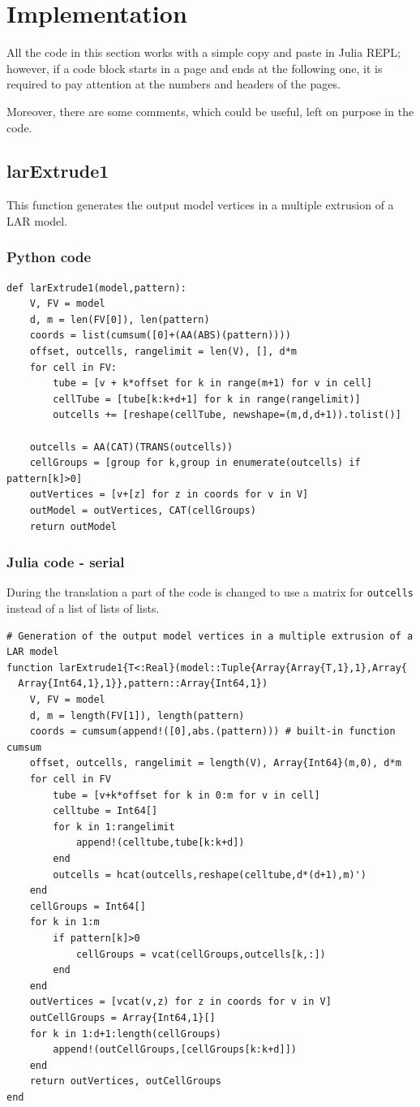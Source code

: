 \documentclass[a4paper,12pt,titlepage]{article}					%
\begin{document}
\section{Implementation}
All the code in this section works with a simple copy and paste in Julia REPL; however, if a code block starts in a page and ends at the following one, it is required to pay attention at the numbers and headers of the pages.

Moreover, there are some comments, which could be useful, left on purpose in the code.

\subsection{larExtrude1}
This function generates the output model vertices in a multiple extrusion of a LAR model.

\subsubsection{Python code}
\begin{verbatim}
def larExtrude1(model,pattern):
    V, FV = model
    d, m = len(FV[0]), len(pattern)
    coords = list(cumsum([0]+(AA(ABS)(pattern))))
    offset, outcells, rangelimit = len(V), [], d*m
    for cell in FV:
        tube = [v + k*offset for k in range(m+1) for v in cell]
        cellTube = [tube[k:k+d+1] for k in range(rangelimit)]
        outcells += [reshape(cellTube, newshape=(m,d,d+1)).tolist()]
        
    outcells = AA(CAT)(TRANS(outcells))
    cellGroups = [group for k,group in enumerate(outcells) if pattern[k]>0]
    outVertices = [v+[z] for z in coords for v in V]
    outModel = outVertices, CAT(cellGroups)
    return outModel
\end{verbatim}

\subsubsection{Julia code - serial}
During the translation a part of the code is changed to use a matrix for \texttt{outcells} instead of a list of lists of lists.

\begin{Verbatim}
# Generation of the output model vertices in a multiple extrusion of a LAR model
function larExtrude1{T<:Real}(model::Tuple{Array{Array{T,1},1},Array{
  Array{Int64,1},1}},pattern::Array{Int64,1})
	V, FV = model
	d, m = length(FV[1]), length(pattern)
	coords = cumsum(append!([0],abs.(pattern))) # built-in function cumsum
	offset, outcells, rangelimit = length(V), Array{Int64}(m,0), d*m
	for cell in FV
		tube = [v+k*offset for k in 0:m for v in cell]
		celltube = Int64[]
		for k in 1:rangelimit
			append!(celltube,tube[k:k+d])
		end
		outcells = hcat(outcells,reshape(celltube,d*(d+1),m)')
	end
	cellGroups = Int64[]
	for k in 1:m
		if pattern[k]>0
			cellGroups = vcat(cellGroups,outcells[k,:])
		end
	end
	outVertices = [vcat(v,z) for z in coords for v in V]
	outCellGroups = Array{Int64,1}[]
	for k in 1:d+1:length(cellGroups)
		append!(outCellGroups,[cellGroups[k:k+d]])
	end
	return outVertices, outCellGroups
end
\end{Verbatim}
\end{document}
